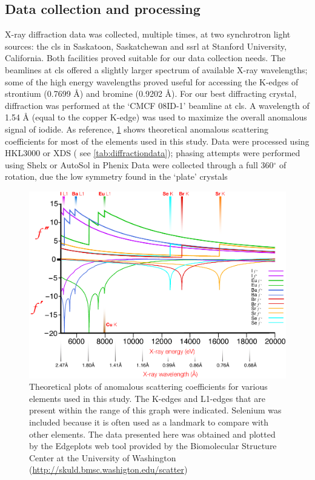 \subsection{Data collection and processing}\label{sec:crystal-data-collection}
X-ray diffraction data was collected, multiple times, at two synchrotron light
sources: the \ac{cls} in Saskatoon, Saskatchewan and \ac{ssrl} at Stanford
University, California. Both facilities proved suitable for our data collection
needs. The beamlines at \ac{cls} offered a slightly larger spectrum of available
X-ray wavelengths; some of the high energy wavelengths proved useful for
accessing the K-edges of strontium (0.7699 \AA) and bromine (0.9202 \AA). For
our best diffracting crystal, diffraction was performed at the `CMCF 08ID-1'
beamline at \ac{cls}. A wavelength of 1.54 \AA{} (equal to the copper K-edge) was
used to maximize the overall anomalous signal of iodide.  As
reference, \cref{fig:edges} shows theoretical anomalous scattering coefficients
for most of the elements used in this study. Data were processed using
HKL3000 or XDS ( see
\cref{tab:diffractiondata}); phasing attempts were performed using
Shelx or AutoSol in
Phenix Data were collected through a full
360$^{\circ}$ of rotation, due the low symmetry found in the `plate' crystals

\begin{figure}[htb]
  	\begin{center}
   		\includegraphics[width=\textwidth]{crystal_chapter/img/edgeplots.pdf}
   	\end{center}
   	\caption[Edge plots for useful anomalous dispersion elements]{
   	Theoretical plots of anomalous scattering coefficients for various elements
    used in this study. The K-edges and L1-edges that are present within the
    range of this graph were indicated. Selenium was included because it is
    often used as a landmark to compare with other elements. The data presented
    here was obtained and plotted by the Edgeplots web tool provided by the
    Biomolecular Structure Center at the University of Washington (\url{http://skuld.bmsc.washigton.edu/scatter})}
   	\label{fig:edges}
\end{figure}    

